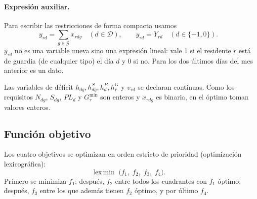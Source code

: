 \paragraph{Expresión auxiliar.} Para escribir las restricciones de forma compacta usamos
\[
y_{rd} = \sum_{g \in \mathcal{G}} x_{rdg} \quad (d \in \mathcal{D}), \qquad y_{rd} = Y_{rd} \quad (d \in \{-1, 0\}).
\]
$y_{rd}$ no es una variable nueva sino una expresión lineal: vale 1 si el residente $r$ está de guardia (de cualquier tipo) el día $d$ y 0 si no. Para los dos últimos días del mes anterior es un dato.

Las variables de déficit $h_{dg}, h^{S}_{dg}, h^{P}_{d}, h^{G}_{r}$ y $v_{rd}$ se declaran continuas. Como los requisitos $N_{dg}$, $S_{dg}$, $PL_d$ y $G^{\min}_r$ son enteros y $x_{rdg}$ es binaria, en el óptimo toman valores enteros.

\subsection{Función objetivo}

Los cuatro objetivos se optimizan en orden estricto de prioridad (optimización lexicográfica):
\[
\operatorname{lex\,min}\; \bigl(f_1,\; f_2,\; f_3,\; f_4\bigr).
\]
Primero se minimiza $f_1$; después, $f_2$ entre todos los cuadrantes con $f_1$ óptimo; después, $f_3$ entre los que además tienen $f_2$ óptimo, y por último $f_4$.

